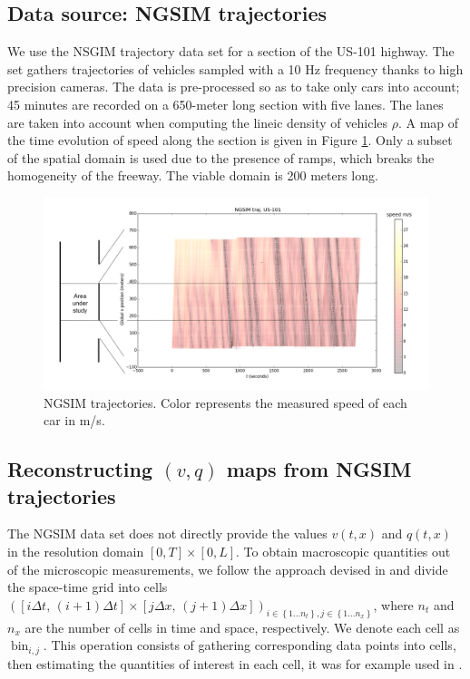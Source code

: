 \documentclass[preprint]{elsarticle}
\DeclareMathOperator{\bin}{bin}
\begin{document}
\subsection{Data source: NGSIM trajectories}

We use the NSGIM trajectory data set for a section of the US-101 highway. The set gathers trajectories of vehicles sampled with a 10 Hz frequency thanks to high precision cameras. The data is pre-processed so as to take only cars into account; 45 minutes are recorded on a 650-meter long section with five lanes. The lanes are taken into account when computing the lineic density of vehicles $\rho$.
A map of the time evolution of speed along the section is given in Figure \ref{fig:NGSIM-trajectories}.
Only a subset of the spatial domain is used due to the presence of ramps, which breaks the homogeneity of the freeway. The viable domain is 200 meters long.

\begin{figure}[H]
\centering
\includegraphics[width=12cm]{US-101_all_traj_low_res_mod}
\protect\caption{NGSIM trajectories. Color represents the measured speed of each
car in m/s.}
\label{fig:NGSIM-trajectories}
\end{figure}



\subsection{Reconstructing $(v,q)$ maps from NGSIM trajectories}

The NGSIM data set does not directly provide the values $v(t,x)$
and $q(t,x)$ in the resolution domain $\left[0,T\right]\times\left[0,L\right]$. To obtain macroscopic quantities out of the microscopic measurements, we follow the approach devised in \cite{edie1963discussion} and divide the space-time grid into cells $\left(\left[i\Delta t,\, \left(i+1\right)\Delta t\right]\times\left[j\Delta x, \, (j+1)\Delta x\right]\right)_{i\in\left\{ 1\ldots n_{t}\right\} ,j\in\left\{ 1\ldots n_{x}\right\} }$, where $n_t$ and $n_x$ are the number of cells in time and space, respectively. We denote each cell as $\bin_{i,j}$. This operation consists of gathering corresponding data points into cells, then estimating the quantities of interest in each cell, it was for example used in \cite{Piccoli201532}.
\end{document}
